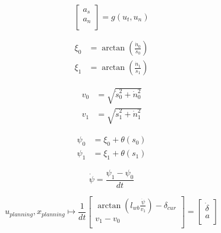 \[
	\begin{bmatrix}
		a_s \\
		a_n \\
	\end{bmatrix} = g(u_t, u_n)
\]

\[
	\begin{aligned}
		\xi_0 & = \arctan\left(\frac{\dot{n}_0}{\dot{s}_0}\right) \\
		\xi_1 & = \arctan\left(\frac{\dot{n}_1}{\dot{s}_1}\right)
	\end{aligned}
\]

\[
	\begin{aligned}
		v_0 & = \sqrt{\dot{s}_0^2 + \dot{n}_0^2} \\
		v_1 & = \sqrt{\dot{s}_1^2 + \dot{n}_1^2}
	\end{aligned}
\]

\[
	\begin{aligned}
		\psi_0 & = \xi_0 + \theta(s_0) \\
		\psi_1 & = \xi_1 + \theta(s_1)
	\end{aligned}
\]

\[
	\dot{\psi} = \frac{\psi_1 - \psi_0}{dt}
\]

\[
	u_{planning}, x_{planning} \mapsto \frac{1}{dt} \begin{bmatrix}
		\arctan(l_{wb}\frac{\dot{\psi}}{v_1})-\delta_{cur} \\
		v_1 - v_0                                          \\
	\end{bmatrix} = \begin{bmatrix}
		\dot{\delta} \\
		a            \\
	\end{bmatrix}
\]

